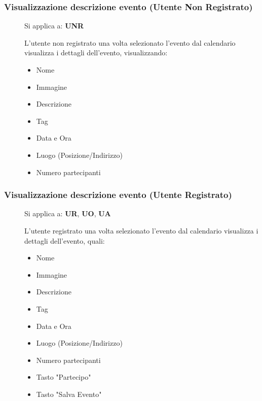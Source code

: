 \documentclass{article}
\begin{document}
\subsubsection{Visualizzazione descrizione evento (Utente Non Registrato)} \label{rf_3}
\begin{description}
    \item[] Si applica a: \textbf{UNR}
    \item[] L'utente non registrato una volta selezionato l'evento dal calendario visualizza i dettagli dell'evento, visualizzando:
          \begin{itemize}
              \item Nome
              \item Immagine
              \item Descrizione
              \item Tag
              \item Data e Ora
              \item Luogo (Posizione/Indirizzo)
              \item Numero partecipanti
          \end{itemize}
\end{description}
\subsubsection{Visualizzazione descrizione evento (Utente Registrato)} \label{rf_4}
\begin{description}
    \item[] Si applica a: \textbf{UR}, \textbf{UO}, \textbf{UA}
    \item[] L'utente registrato una volta selezionato l'evento dal calendario visualizza i dettagli dell'evento, quali:
          \begin{itemize}
              \item Nome
              \item Immagine
              \item Descrizione
              \item Tag
              \item Data e Ora
              \item Luogo (Posizione/Indirizzo)
              \item Numero partecipanti
              \item Tasto "Partecipo"
              \item Tasto "Salva Evento"
          \end{itemize}
\end{description}
\end{document}
